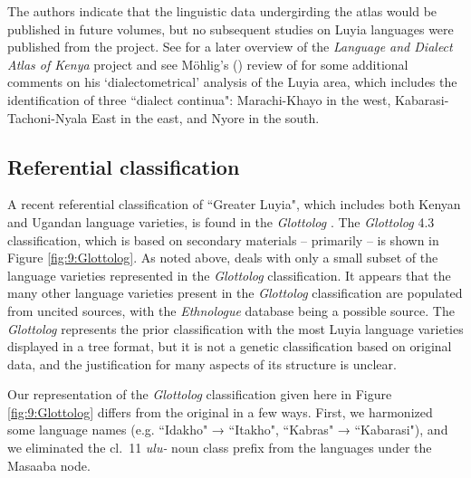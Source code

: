 \documentclass[output=paper]{langscibook}
\begin{document}
The authors indicate that the linguistic data undergirding the atlas would be published in future volumes, but no subsequent studies on Luyia languages were published from the project. See \citet{heine_language_2013} for a later overview of the \textit{Language and Dialect Atlas of Kenya} project and see Möhlig's  (\citeyear{mohlig-1985-review-of-angogo-kanyoro-1983}) review of \citet{angogokanyoro1983} for some additional comments on his `dialectometrical' analysis of the Luyia area, which includes the identification of three ``dialect continua": Marachi-Khayo in the west, Kabarasi-Tachoni-Nyala East in the east, and Nyore in the south. 


\subsection{Referential classification \citep{glottolog}}
\label{sec:2.4:Referential_classification}

A recent referential classification of ``Greater Luyia", which includes both Kenyan and Ugandan language varieties, is found in the \textit{Glottolog} \citep{glottolog}. The \textit{Glottolog} 4.3 classification, which is based on secondary materials -- primarily \citet{mould_greater_1981} -- is shown in Figure \ref{fig:9:Glottolog}. As noted above, \citet{mould_greater_1981} deals with only a small subset of the language varieties represented in the \textit{Glottolog} classification. It appears that the many other language varieties present in the \textit{Glottolog} classification are populated from uncited sources, with the \textit{Ethnologue} database being a possible source. The \textit{Glottolog} represents the prior classification with the most Luyia language varieties displayed in a tree format, but it is not a genetic classification based on original data, and the justification for many aspects of its structure is unclear. 

Our representation of the \textit{Glottolog} classification given here in Figure \ref{fig:9:Glottolog} differs from the original in a few ways. First, we harmonized some language names (e.g. ``Idakho" → ``Itakho", ``Kabras" → ``Kabarasi"), and we eliminated the cl.\ 11 \textit{ulu-} noun class prefix from the languages under the Masaaba node. 
\end{document}
